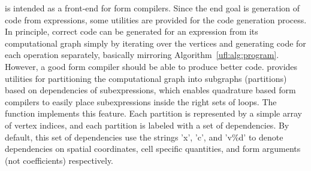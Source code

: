 \ufl{} is intended as a front-end for form compilers.  Since the
end goal is generation of code from expressions, some utilities are
provided for the code generation process. In principle, correct code
can be generated for an expression from its computational graph simply
by iterating over the vertices and generating code for each operation
separately, basically mirroring Algorithm~\ref{ufl:alg:program}.
However, a good form compiler should be able to produce better code.
\ufl{} provides utilities for partitioning the computational graph into
subgraphs (partitions) based on dependencies of subexpressions, which
enables quadrature based form compilers to easily place subexpressions
inside the right sets of loops.  The function  implements
this feature.  Each partition is represented by a simple array of vertex
indices, and each partition is labeled with a set of dependencies. By
default, this set of dependencies use the strings 'x', 'c', and 'v\%d'
to denote dependencies on spatial coordinates, cell specific quantities,
and form arguments (not coefficients) respectively.

